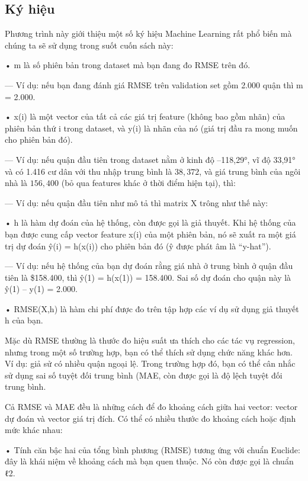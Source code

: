 \subsection{Ký hiệu}

Phương trình này giới thiệu một số ký hiệu Machine Learning rất phổ biến mà chúng ta sẽ sử dụng trong suốt cuốn sách này:

• m là số phiên bản trong dataset mà bạn đang đo RMSE trên đó.

— Ví dụ: nếu bạn đang đánh giá RMSE trên validation set gồm 2.000 quận thì m = 2.000.

• x(i) là một vector của tất cả các giá trị feature (không bao gồm nhãn) của phiên bản thứ i trong dataset, và y(i) là nhãn của nó (giá trị đầu ra mong muốn cho phiên bản đó).

— Ví dụ: nếu quận đầu tiên trong dataset nằm ở kinh độ –118,29°, vĩ độ 33,91° và có 1.416 cư dân với thu nhập trung bình là $38,372$, và giá trung bình của ngôi nhà là $156,400$ (bỏ qua features khác ở thời điểm hiện tại), thì:

— Ví dụ: nếu quận đầu tiên như mô tả thì matrix X trông như thế này:

• h là hàm dự đoán của hệ thống, còn được gọi là giả thuyết. Khi hệ thống của bạn được cung cấp vector feature x(i) của một phiên bản, nó sẽ xuất ra một giá trị dự đoán ŷ(i) = h(x(i)) cho phiên bản đó (ŷ được phát âm là “y-hat”).

— Ví dụ: nếu hệ thống của bạn dự đoán rằng giá nhà ở trung bình ở quận đầu tiên là \$158.400, thì ŷ(1) = h(x(1)) = 158.400. Sai số dự đoán cho quận này là ŷ(1) – y(1) = 2.000.

• RMSE(X,h) là hàm chi phí được đo trên tập hợp các ví dụ sử dụng giả thuyết h của bạn.

Mặc dù RMSE thường là thước đo hiệu suất ưa thích cho các tác vụ regression, nhưng trong một số trường hợp, bạn có thể thích sử dụng chức năng khác hơn. Ví dụ: giả sử có nhiều quận ngoại lệ. Trong trường hợp đó, bạn có thể cân nhắc sử dụng sai số tuyệt đối trung bình (MAE, còn được gọi là độ lệch tuyệt đối trung bình.

Cả RMSE và MAE đều là những cách để đo khoảng cách giữa hai vector: vector dự đoán và vector giá trị đích. Có thể có nhiều thước đo khoảng cách hoặc định mức khác nhau:

• Tính căn bậc hai của tổng bình phương (RMSE) tương ứng với chuẩn Euclide: đây là khái niệm về khoảng cách mà bạn quen thuộc. Nó còn được gọi là chuẩn ℓ2.

